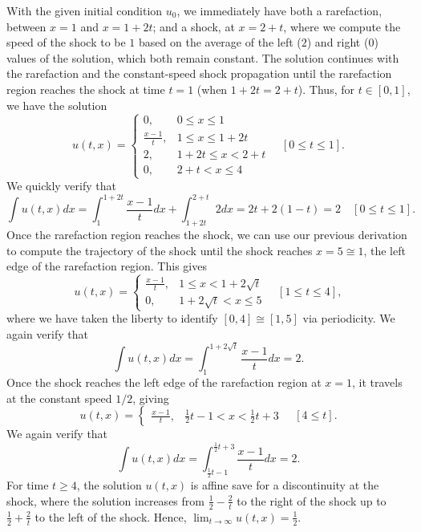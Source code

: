 \documentclass{article}
\begin{document}
\begin{itemize}
With the given initial condition $u_0$, we immediately have both a rarefaction, between $x = 1$ and $x = 1 + 2t$; and a shock, at $x = 2 + t$, where we compute the speed of the shock to be $1$ based on the average of the left ($2$) and right ($0$) values of the solution, which both remain constant. The solution continues with the rarefaction and the constant-speed shock propagation until the rarefaction region reaches the shock at time $t = 1$ (when $1 + 2t = 2 + t$). Thus, for $t \in [0,1]$, we have the solution
\begin{equation*}
u(t,x) = \begin{cases} 0, & 0 \leq x \leq 1 \\ \frac{x-1}{t}, & 1 \leq x \leq 1 + 2t \\ 2, & 1 + 2t \leq x < 2 + t \\ 0, & 2 + t < x \leq 4 \end{cases} \quad \left[ 0 \leq t \leq 1 \right].
\end{equation*}
We quickly verify that
\begin{equation*}
\int u(t,x) dx = \int_1^{1+2t} \frac{x-1}{t} dx + \int_{1+2t}^{2+t} 2 dx = 2t + 2 \left( 1 - t \right) = 2 \quad \left[ 0 \leq t \leq 1 \right].
\end{equation*}
Once the rarefaction region reaches the shock, we can use our previous derivation to compute the trajectory of the shock until the shock reaches $x = 5 \cong 1$, the left edge of the rarefaction region. This gives
\begin{equation*}
u(t,x) = \begin{cases} \frac{x-1}{t}, & 1 \leq x < 1 + 2 \sqrt{t} \\ 0, & 1 + 2 \sqrt{t} < x \leq 5 \end{cases} \quad \left[ 1 \leq t \leq 4 \right],
\end{equation*}
where we have taken the liberty to identify $[0,4] \cong [1,5]$ via periodicity. We again verify that
\begin{equation*}
\int u(t,x) dx = \int_1^{1 + 2 \sqrt{t}} \frac{x-1}{t} dx = 2.
\end{equation*}
Once the shock reaches the left edge of the rarefaction region at $x = 1$, it travels at the constant speed $1/2$, giving
\begin{equation*}
u(t,x) = \begin{cases} \frac{x-1}{t}, & \frac{1}{2} t - 1 < x < \frac{1}{2} t + 3 \end{cases} \quad \left[ 4 \leq t \right].
\end{equation*}
We again verify that
\begin{equation*}
\int u(t,x) dx = \int_{\frac{1}{2} t - 1}^{\frac{1}{2} t + 3} \frac{x-1}{t} dx = 2.
\end{equation*}
For time $t \geq 4$, the solution $u(t,x)$ is affine save for a discontinuity at the shock, where the solution increases from $\frac{1}{2} - \frac{2}{t}$ to the right of the shock up to $\frac{1}{2} + \frac{2}{t}$ to the left of the shock. Hence, $\lim_{t \to \infty} u(t,x) = \frac{1}{2}$.


\end{itemize}
\end{document}
